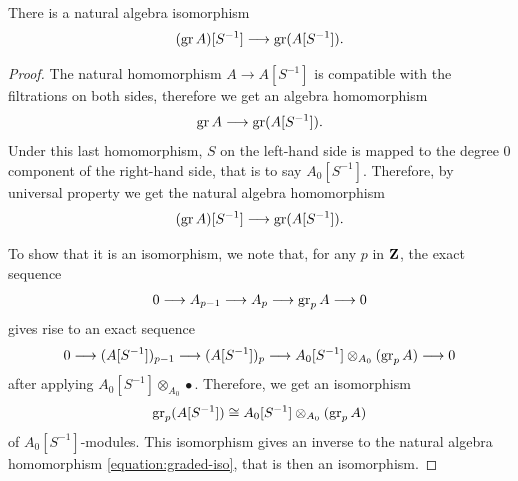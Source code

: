 \begin{proposition} \label{proposition:gr-localisation}
	There is a natural algebra isomorphism
	\[ (\operatorname{gr} A)[S^{-1}] \longrightarrow \operatorname{gr}(A[S^{-1}]). \]
\end{proposition}

\begin{proof}
	The natural homomorphism $A \rightarrow A[S^{-1}]$ is compatible with the filtrations on both sides, therefore we get an algebra homomorphism
	\[ \operatorname{gr} A \longrightarrow \operatorname{gr}(A[S^{-1}]). \]
	Under this last homomorphism, $S$ on the left-hand side is mapped to the degree $0$ component of the right-hand side, that is to say $A_0[S^{-1}]$. Therefore, by universal property we get the natural algebra homomorphism
	\begin{equation} \label{equation:graded-iso} (\operatorname{gr} A)[S^{-1}] \longrightarrow \operatorname{gr}(A[S^{-1}]). \end{equation}
	
	To show that it is an isomorphism, we note that, for any $p$ in $\mathbf{Z}$, the exact sequence
	\[ 0 \longrightarrow A_{p - 1} \longrightarrow A_p \longrightarrow \operatorname{gr}_p A \longrightarrow 0 \]
	gives rise to an exact sequence
	\[ 0 \longrightarrow (A[S^{-1}])_{p - 1} \longrightarrow (A[S^{-1}])_p \longrightarrow A_0[S^{-1}] \otimes_{A_0} (\operatorname{gr}_p A) \longrightarrow 0 \]
	after applying $A_0[S^{-1}] \otimes_{A_0} \bullet$. Therefore, we get an isomorphism
	\[ \operatorname{gr}_p(A[S^{-1}]) \cong A_0[S^{-1}] \otimes_{A_0} (\operatorname{gr}_p A) \]
	of $A_0[S^{-1}]$-modules. This isomorphism gives an inverse to the natural algebra homomorphism \eqref{equation:graded-iso}, that is then an isomorphism.
\end{proof}

%
%
%
%
%	
%	

